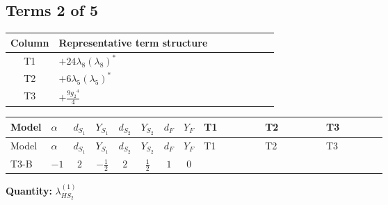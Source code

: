 \documentclass[8pt]{article}
\begin{document}
\begin{landscape}
\subsection*{Terms 2 of 5}
\begin{center}
\begin{tabular}{@{}c >{\raggedright\arraybackslash}p{0.82\linewidth}@{}}
\toprule
Column & Representative term structure \\
\midrule
T1 & \(\displaystyle +24 {\lambda_{8}} \left({\lambda_{8}}\right)^{*}\) \\
\midrule
T2 & \(\displaystyle +6 {\lambda_5} \left({\lambda_5}\right)^{*}\) \\
\midrule
T3 & \(\displaystyle +\frac{9 {g_2}^4}{4}\) \\
\midrule
\bottomrule
\end{tabular}
\end{center}
\smallskip
\tiny
\begin{longtable}{@{}llcccccc >{\raggedright\arraybackslash}p{0.21\linewidth} >{\raggedright\arraybackslash}p{0.21\linewidth} >{\raggedright\arraybackslash}p{0.21\linewidth}@{}}
\toprule
Model & $\alpha$ & $d_{S_1}$ & $Y_{S_1}$ & $d_{S_2}$ & $Y_{S_2}$ & $d_F$ & $Y_F$ & T1 & T2 & T3 \\
\midrule
\endfirsthead
\toprule
Model & $\alpha$ & $d_{S_1}$ & $Y_{S_1}$ & $d_{S_2}$ & $Y_{S_2}$ & $d_F$ & $Y_F$ & T1 & T2 & T3 \\
\midrule
\endhead
T3-B & $-1$ & $2$ & $-\frac{1}{2}$ & $2$ & $\frac{1}{2}$ & $1$ & $0$ & \scriptsize\adjustbox{max width=\linewidth}{$\begin{gathered} +24 {\lambda_{8}} \left({\lambda_{8}}\right)^{*}\end{gathered}$} & \scriptsize\adjustbox{max width=\linewidth}{$\begin{gathered} +6 {\lambda_5} \left({\lambda_5}\right)^{*}\end{gathered}$} & \scriptsize\adjustbox{max width=\linewidth}{$\begin{gathered} +\frac{9 {g_2}^4}{4}\end{gathered}$} \\
\midrule
\bottomrule
\end{longtable}
\clearpage
\noindent\textbf{Quantity: }$\lambda_{HS_2}^{(1)}$\par\smallskip

\end{landscape}
\end{document}
